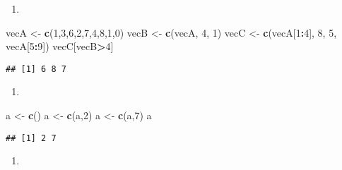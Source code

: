 \documentclass[]{article}
\newenvironment{Shaded}{\begin{snugshade}}{\end{snugshade}}
\newcommand{\KeywordTok}[1]{\textcolor[rgb]{0.13,0.29,0.53}{\textbf{#1}}}
\newcommand{\DecValTok}[1]{\textcolor[rgb]{0.00,0.00,0.81}{#1}}
\newcommand{\StringTok}[1]{\textcolor[rgb]{0.31,0.60,0.02}{#1}}
\newcommand{\OperatorTok}[1]{\textcolor[rgb]{0.81,0.36,0.00}{\textbf{#1}}}
\newcommand{\NormalTok}[1]{#1}
\begin{document}
\begin{enumerate}
\def\labelenumi{\alph{enumi}.}
\item
\end{enumerate}

\begin{Shaded}
\begin{Highlighting}[]
\NormalTok{vecA <-}\StringTok{ }\KeywordTok{c}\NormalTok{(}\DecValTok{1}\NormalTok{,}\DecValTok{3}\NormalTok{,}\DecValTok{6}\NormalTok{,}\DecValTok{2}\NormalTok{,}\DecValTok{7}\NormalTok{,}\DecValTok{4}\NormalTok{,}\DecValTok{8}\NormalTok{,}\DecValTok{1}\NormalTok{,}\DecValTok{0}\NormalTok{)}
\NormalTok{vecB <-}\StringTok{ }\KeywordTok{c}\NormalTok{(vecA, }\DecValTok{4}\NormalTok{, }\DecValTok{1}\NormalTok{)}
\NormalTok{vecC <-}\StringTok{ }\KeywordTok{c}\NormalTok{(vecA[}\DecValTok{1}\OperatorTok{:}\DecValTok{4}\NormalTok{], }\DecValTok{8}\NormalTok{, }\DecValTok{5}\NormalTok{, vecA[}\DecValTok{5}\OperatorTok{:}\DecValTok{9}\NormalTok{])}
\NormalTok{vecC[vecB}\OperatorTok{>}\DecValTok{4}\NormalTok{]}
\end{Highlighting}
\end{Shaded}

\begin{verbatim}
## [1] 6 8 7
\end{verbatim}

\begin{enumerate}
\def\labelenumi{\alph{enumi}.}
\setcounter{enumi}{1}
\item
\end{enumerate}

\begin{Shaded}
\begin{Highlighting}[]
\NormalTok{a <-}\StringTok{ }\KeywordTok{c}\NormalTok{()}
\NormalTok{a <-}\StringTok{ }\KeywordTok{c}\NormalTok{(a,}\DecValTok{2}\NormalTok{)}
\NormalTok{a <-}\StringTok{ }\KeywordTok{c}\NormalTok{(a,}\DecValTok{7}\NormalTok{)}
\NormalTok{a}
\end{Highlighting}
\end{Shaded}

\begin{verbatim}
## [1] 2 7
\end{verbatim}

\begin{enumerate}
\def\labelenumi{\alph{enumi}.}
\setcounter{enumi}{2}
\item
\end{enumerate}
\end{document}

